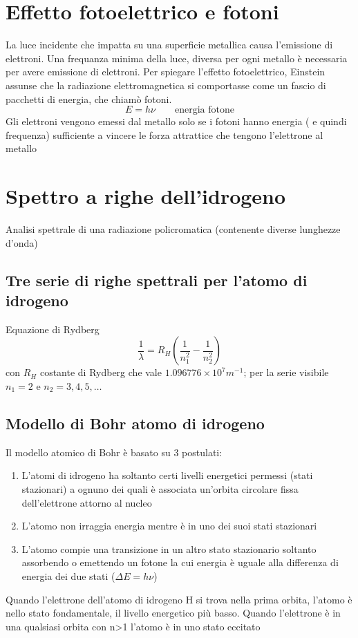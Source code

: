\documentclass[a4paper,11pt]{report}
\begin{document}
\section{Effetto fotoelettrico e fotoni}

La luce incidente che impatta su una superficie metallica causa l'emissione di elettroni. 
Una frequanza minima della luce, diversa per ogni metallo è necessaria per avere emissione di elettroni.
Per spiegare l'effetto fotoelettrico, Einstein assunse che la radiazione elettromagnetica si comportasse come un fascio di pacchetti di energia, che chiamò fotoni.
\begin{equation*}
	E = h\nu \qquad \text{energia fotone}
\end{equation*}
Gli elettroni vengono emessi dal metallo solo se i fotoni hanno energia ( e quindi frequenza) sufficiente a vincere le forza attrattice che tengono l'elettrone al metallo

\section{Spettro a righe dell'idrogeno}
Analisi spettrale di una radiazione policromatica (contenente diverse lunghezze d'onda)

\subsection*{Tre serie di righe spettrali per l'atomo di idrogeno}

Equazione di Rydberg
\begin{equation*}
	\frac{1}{\lambda} = R_H \left(\frac{1}{n^2_1}-\frac{1}{n^2_2}\right)
\end{equation*}
con $R_H$ costante di Rydberg che vale $1.096776 \times 10^7 m^{-1}$; per la serie visibile $n_1=2$ e $n_2 = 3,4,5,\dots$ 

\subsection*{Modello di Bohr atomo di idrogeno}

Il modello atomico di Bohr è basato su 3 postulati:
\begin{enumerate}
	\item L'atomi di idrogeno ha soltanto certi livelli energetici permessi (stati stazionari) a ognuno dei quali è associata un'orbita circolare fissa dell'elettrone attorno al nucleo
	\item L'atomo non irraggia energia mentre è in uno dei suoi stati stazionari
	\item L'atomo compie una transizione in un altro stato stazionario soltanto assorbendo o emettendo un fotone la cui energia è uguale alla differenza di energia dei due stati ($\Delta E = h\nu$)
\end{enumerate}
Quando l'elettrone dell'atomo di idrogeno H si trova nella prima orbita, l'atomo è nello stato fondamentale, il livello energetico più basso. 
Quando l'elettrone è in una qualsiasi orbita con n>1 l'atomo è in uno stato eccitato
\end{document}
